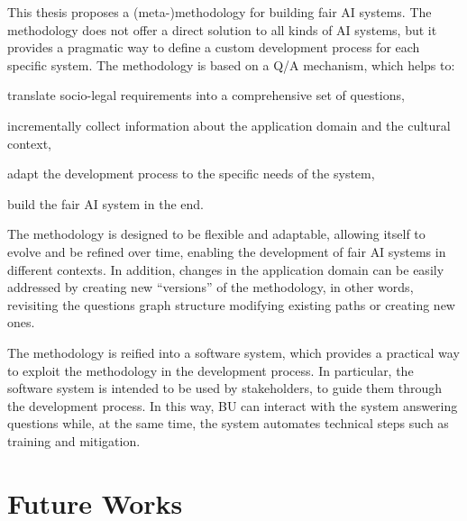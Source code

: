 \documentclass[12pt,a4paper,openright,twoside]{book}
\begin{document}
This thesis proposes a (meta-)methodology for building fair \ac{AI} systems.
%
The methodology does not offer a direct solution to all kinds of \ac{AI} systems, but it provides a pragmatic way to define a custom development process for each specific system.
%
The methodology is based on a \ac{Q/A} mechanism, which helps to:
\begin{enumerate*}[label=(\roman*)]
    \item translate socio-legal requirements into a comprehensive set of questions,
    \item incrementally collect information about the application domain and the cultural context,
    \item adapt the development process to the specific needs of the system,
    \item build the fair \ac{AI} system in the end.
\end{enumerate*}
%
The methodology is designed to be flexible and adaptable, allowing itself to evolve and be refined over time, enabling the development of fair \ac{AI} systems in different contexts.
%
In addition, changes in the application domain can be easily addressed by creating new ``versions'' of the methodology, in other words, revisiting the questions graph structure modifying existing paths or creating new ones.

The methodology is reified into a software system, which provides a practical way to exploit the methodology in the development process.
%
In particular, the software system is intended to be used by stakeholders, to guide them through the development process.
%
In this way, \acl{BU} can interact with the system answering questions while, at the same time, the system automates technical steps such as training and mitigation.


\section{Future Works}

\end{document}
